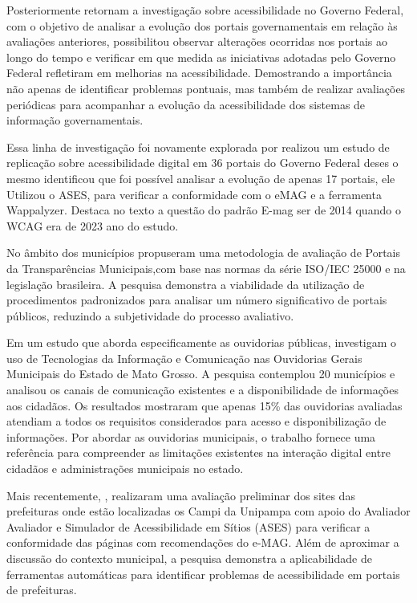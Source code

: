 \documentclass[12pt]{article}
\begin{document}
Posteriormente \cite{10.1145/3411564.3411656} retornam a investigação sobre acessibilidade no Governo Federal, com o objetivo de analisar a evolução dos portais governamentais em relação às avaliações anteriores,  possibilitou observar alterações ocorridas nos portais ao longo do tempo e verificar em que medida as iniciativas adotadas pelo Governo Federal refletiram em melhorias na acessibilidade. Demostrando a importância não apenas de identificar problemas pontuais, mas também de realizar avaliações periódicas para acompanhar a evolução da acessibilidade dos sistemas de informação governamentais.

Essa linha de investigação foi novamente explorada por  \cite{10.1145/3658271.3658276}  realizou um estudo de replicação sobre acessibilidade digital em 36 portais do Governo Federal deses o mesmo identificou que foi possível analisar a evolução de apenas 17 portais, ele Utilizou o ASES, para verificar a conformidade com o eMAG e  a ferramenta Wappalyzer. Destaca no texto a questão do padrão E-mag ser de 2014 quando o WCAG era de 2023 ano do estudo.

No âmbito dos municípios \cite{sbsiAmorim_Menezes} propuseram uma metodologia de avaliação de Portais da Transparências Municipais,com base nas normas da série ISO/IEC 25000 e na legislação brasileira. A pesquisa demonstra a viabilidade da utilização de procedimentos padronizados para analisar um número significativo de portais públicos, reduzindo a subjetividade do processo avaliativo. 

Em um estudo que aborda especificamente as ouvidorias públicas, \cite{wcge} investigam o uso de Tecnologias da Informação e Comunicação nas Ouvidorias Gerais Municipais do Estado de Mato Grosso. A pesquisa contemplou 20 municípios e analisou os canais de comunicação existentes e a disponibilidade de informações aos cidadãos. Os resultados mostraram que apenas 15\% das ouvidorias avaliadas atendiam a todos os requisitos considerados para acesso e disponibilização de informações. Por abordar as ouvidorias municipais, o trabalho fornece uma referência para compreender as limitações existentes na interação digital entre cidadãos e administrações municipais no estado.

Mais recentemente, \cite{eres}, realizaram uma avaliação preliminar dos sites das prefeituras onde estão localizadas os Campi da Unipampa com apoio do Avaliador Avaliador e Simulador de Acessibilidade em Sítios (ASES) para verificar a conformidade das páginas com recomendações do e-MAG. Além de aproximar a discussão do contexto municipal, a pesquisa demonstra a aplicabilidade de ferramentas automáticas para identificar problemas de acessibilidade em portais de prefeituras. 
\end{document}
